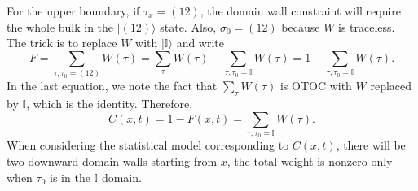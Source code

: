 \documentclass[aps,prb,superscriptaddress,nofootinbib]{revtex4}
\begin{document}
For the upper boundary, if $\tau_x = (12)$, the domain wall constraint will require the whole bulk in the $|(12)\rangle$ state. 
Also, $\sigma_0 = (12)$ because $W$ is traceless.
The trick is to replace $\tilde W$ with $|\mathbb I\rangle$ and write
\begin{equation}
	F = \sum_{\tau,\tau_0=(12)} W(\tau) 
	= \sum_\tau W(\tau) - \sum_{\tau,\tau_0=\mathbb I} W(\tau)
	= 1 - \sum_{\tau,\tau_0=\mathbb I} W(\tau).
\end{equation}
In the last equation, we note the fact that $\sum_\tau W(\tau)$ is OTOC with $W$ replaced by $\mathbb I$, which is the identity.
Therefore, 
\begin{equation}
	C(x,t) = 1 - F(x,t) = \sum_{\tau,\tau_0=\mathbb I} W(\tau).
\end{equation}
When considering the statistical model corresponding to $C(x,t)$, there will be two downward domain walls starting from $x$, the total weight is nonzero only when $\tau_0$ is in the $\mathbb I$ domain.
\end{document}
